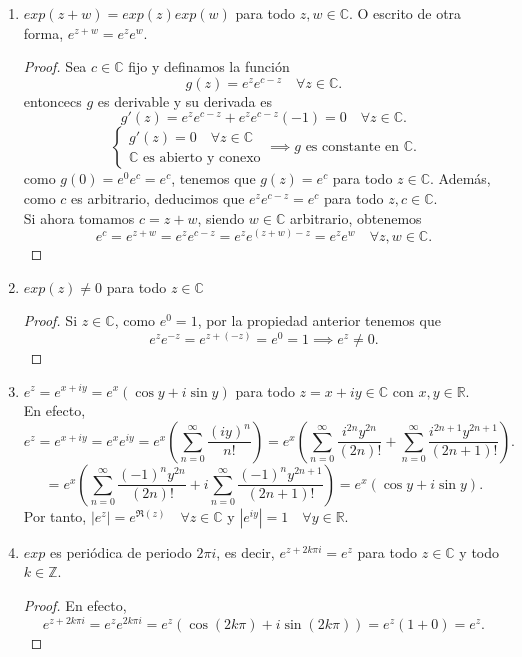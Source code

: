 \begin{enumerate}
    \item $exp(z+w) = exp(z)exp(w)$ para todo \(z,w\in\mathbb{C}\). O escrito de otra forma, $e^{z+w} = e^z e^w$.
    \begin{proof}
        Sea $c \in \mathbb{C}$ fijo y definamos la función
        \[
            g(z) = e^{z}e^{c-z} \quad \forall z \in \mathbb{C}.
        \] 
        entoncecs $g$ es derivable y su derivada es
        \[
            g'(z) = e^{z}e^{c-z} + e^{z}e^{c-z}(-1) = 0 \quad \forall z \in \mathbb{C}.
        \]
        \[
            \begin{cases}
                g'(z) = 0 \quad \forall z \in \mathbb{C} \\
                \mathbb{C} \text{ es abierto y conexo}
            \end{cases} \implies g \text{ es constante en } \mathbb{C}.
        \]
        como $g(0) = e^0 e^c = e^c$, tenemos que $g(z) = e^c$ para todo \(z\in\mathbb{C}\). Además, como $c$ es arbitrario, deducimos que $e^{z}e^{c-z} = e^c$ para todo \(z,c\in\mathbb{C}\).\\
        Si ahora tomamos \(c=z+w\), siendo $w\in\mathbb{C}$ arbitrario, obtenemos
        \[
            e^{c} = e^{z+w} = e^{z}e^{c-z} = e^{z}e^{(z+w)-z} = e^{z}e^{w} \quad \forall z,w \in \mathbb{C}.
        \]
    \end{proof}
    \item $exp(z) \neq 0$ para todo \(z\in\mathbb{C}\)
    \begin{proof}
        Si $z \in \mathbb{C}$, como $e^0 = 1$, por la propiedad anterior tenemos que
        \[
            e^z e^{-z} = e^{z + (-z)} = e^0 = 1 \implies e^z \neq 0.
        \]
    \end{proof}
    \item $e^z = e^{x+iy} = e^x(\cos y + i \sin y)$ para todo \(z = x + iy \in \mathbb{C}\) con \(x,y \in \mathbb{R}\).\\
    En efecto,
    \[
        e^{z} = e^{x+iy} = e^x e^{iy} = e^x \left(\sum_{n=0}^\infty \frac{(iy)^n}{n!}\right) = e^x \left(\sum_{n=0}^\infty \frac{i^{2n}y^{2n}}{(2n)!} + \sum_{n=0}^\infty \frac{i^{2n+1}y^{2n+1}}{(2n+1)!}\right).  
    \]
    \[
        = e^x \left(\sum_{n=0}^\infty \frac{(-1)^n y^{2n}}{(2n)!} + i\sum_{n=0}^\infty \frac{(-1)^n y^{2n+1}}{(2n+1)!}\right) = e^x(\cos y + i \sin y).
    \]
    Por tanto, $|e^z| = e^{\Re(z)} \quad \forall z \in \mathbb{C}$ y $|e^{iy}| = 1 \quad \forall y \in \mathbb{R}$.
    \item $exp$ es periódica de periodo $2\pi i$, es decir, $e^{z + 2k\pi i} = e^z$ para todo \(z \in \mathbb{C}\) y todo \(k \in \mathbb{Z}\).
    \begin{proof}
        En efecto,
        \[
            e^{z + 2k\pi i} = e^z e^{2k\pi i} = e^z(\cos(2k\pi) + i \sin(2k\pi)) = e^z(1 + 0) = e^z.
        \]
    \end{proof}
\end{enumerate}

